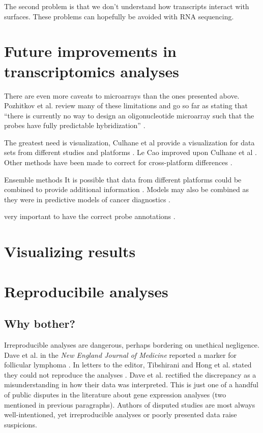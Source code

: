 The second problem is that we don't understand how transcripts
interact with surfaces. These problems can hopefully be avoided
with RNA sequencing.

\section{Future improvements in transcriptomics analyses}

There are even more caveats to microarrays than the ones presented
above. Pozhitkov et al. review many of these limitations and go
so far as stating that ``there is currently no way to design 
an oligonucleotide microarray such that the probes have 
fully predictable hybridization'' \cite{Pozhitkov:2007go}.


The greatest need is visualization, Culhane et al provide a visualization
for data sets from different studies and platforms \cite{Culhane:2003it}.
Le Cao improved upon Culhane et al \cite{Cao:2009dd}.
Other methods have been made to correct for cross-platform differences \cite{Fan:2011iy}.

Ensemble methods
It is possible that data from different platforms could be combined
to provide additional information \cite{Hockley:2009tf}.
Models may also be combined as they were in predictive models
of cancer diagnostics \cite{Chen:2011ib}.

very important to have the correct probe annotations \cite{Carter:2005bq}.

\section{Visualizing results}

\section{Reproducibile analyses}

\subsection{Why bother?}

Irreproducible analyses are dangerous, perhaps bordering on unethical negligence. 
Dave et al. in the \textit{New England
Journal of Medicine} reported a marker for follicular lymphoma \cite{Dave:2004vl}. 
In letters to the editor, Tibshirani and Hong et al. stated they 
could not reproduce the analyses \cite{Tibshirani:2005el}. 
Dave et al. rectified the discrepancy as a misunderstanding
in how their data was interpreted. This is just one of a handful of
public disputes in the literature about gene expression analyses (two mentioned
in previous paragraphs).
Authors of disputed studies are most always well-intentioned, yet 
irreproducible analyses or poorly presented data raise suspicions.

